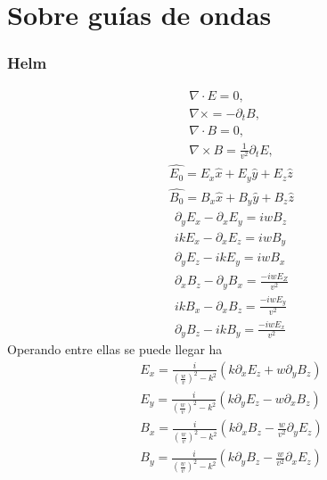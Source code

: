\chapter{Sobre guías de ondas}

\subsection{Helm}
\begin{subequations}\label{Maxwell}
	\begin{align}
	\nabla \cdot E = 0,\label{Primera}\\
	\nabla \times = - \partial_{t} B,\label{segunda}\\
	\nabla \cdot B = 0,\label{tercera}\\
	\nabla \times B=  \frac{1}{v^2} \partial_{t} E,\label{cuarta}
	\end{align}
\end{subequations}
\begin{subequations}\label{Camposincidentes}
	\begin{align}
	\hat{E_{0}} = E_{x}\hat{x} + E_{y}\hat{y}+E_{z}\hat{z} \\
	\hat{B_{0}} = B_{x}\hat{x} + B_{y}\hat{y}+B_{z}\hat{z}
	\end{align}
\end{subequations}
\begin{subequations}\label{Camposexplicitos}
	\begin{align}
	\partial_{y}E_{x}-\partial_{x}E_{y}= i w B_{z} \\
	i k E_{x}-\partial_{x}E_{z}= i w B_{y} \\
	\partial_{y}E_{z}-i k E_{y}= i w B_{x} \\
	\partial_{x}B_{z}-\partial_{y}B_{x}= \frac{-iw E_{Z} }{v^2} \\
	i k B_{x}-\partial_{x}B_{z}= \frac{-iw E_{y} }{v^2} \\
	\partial_{y}B_{z}- i k B_{y}= \frac{-iw E_{x} }{v^2} 
	\end{align}
\end{subequations}
Operando entre ellas se puede llegar ha
\begin{subequations}\label{Ecuacionesdecampo}
	\begin{align}
	E_{x} = \frac{i}{(\frac{w}{v})^2 - k^2} (k \partial_{x}E_{z}+w \partial_{y} B_{z}) \\
	E_{y} = \frac{i}{(\frac{w}{v})^2 - k^2} (k \partial_{y}E_{z}-w \partial_{x} B_{z}) \\
	B_{x} = \frac{i}{(\frac{w}{v})^2 - k^2} (k \partial_{x}B_{z}- \frac{w}{v^2} \partial_{y} E_{z}) \\
	B_{y} = \frac{i}{(\frac{w}{v})^2 - k^2} (k \partial_{y}B_{z}- \frac{w}{v^2} \partial_{x} E_{z}) 
	\end{align}
\end{subequations}
